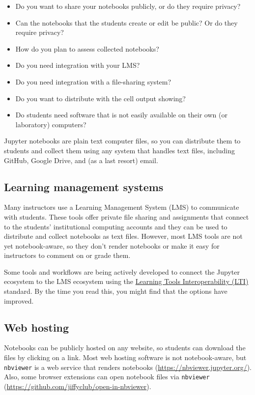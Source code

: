 \documentclass[]{book}
\begin{document}
\begin{itemize}
\item
  Do you want to share your notebooks publicly, or do they require
  privacy?
\item
  Can the notebooks that the students create or edit be public? Or do
  they require privacy?
\item
  How do you plan to assess collected notebooks?
\item
  Do you need integration with your LMS?
\item
  Do you need integration with a file-sharing system?
\item
  Do you want to distribute with the cell output showing?
\item
  Do students need software that is not easily available on their own
  (or laboratory) computers?
\end{itemize}

Jupyter notebooks are plain text computer files, so you can distribute
them to students and collect them using any system that handles text
files, including GitHub, Google Drive, and (as a last resort) email.

\subsection{Learning management
systems}\label{learning-management-systems}

Many instructors use a Learning Management System (LMS) to communicate
with students. These tools offer private file sharing and assignments
that connect to the students' institutional computing accounts and they
can be used to distribute and collect notebooks as text files. However,
most LMS tools are not yet notebook-aware, so they don't render
notebooks or make it easy for instructors to comment on or grade them.

Some tools and workflows are being actively developed to connect the
Jupyter ecosystem to the LMS ecosystem using the
\href{https://open.edx.org/learning-tools-interoperability}{Learning
Tools Interoperability (LTI)} standard. By the time you read this, you
might find that the options have improved.

\subsection{Web hosting}\label{web-hosting}

Notebooks can be publicly hosted on any website, so students can
download the files by clicking on a link. Most web hosting software is
not notebook-aware, but \texttt{nbviewer} is a web service that renders
notebooks (\url{https://nbviewer.jupyter.org/}). Also, some browser
extensions can open notebook files via \texttt{nbviewer}
(\url{https://github.com/jiffyclub/open-in-nbviewer}).
\end{document}
